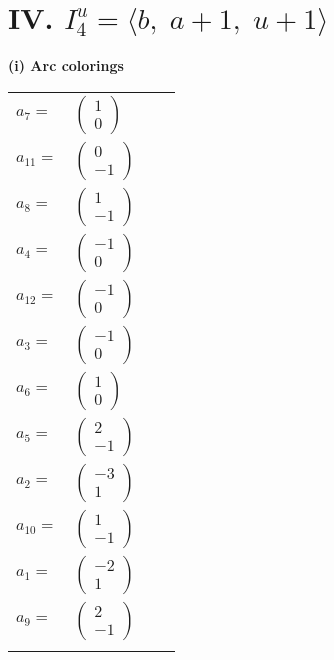 \documentclass[1p]{elsarticle_modified}
\theoremstyle{definition}
\begin{document}
\centering \section*{IV. $I^u_{4}= \langle b,\;a+1,\;u+1 \rangle$}
\flushleft \textbf{(i) Arc colorings}\\
\begin{tabular}{m{7pt} m{180pt} m{7pt} m{180pt} }
\flushright $a_{7}=$&$\begin{pmatrix}1\\0\end{pmatrix}$ \\
\flushright $a_{11}=$&$\begin{pmatrix}0\\-1\end{pmatrix}$ \\
\flushright $a_{8}=$&$\begin{pmatrix}1\\-1\end{pmatrix}$ \\
\flushright $a_{4}=$&$\begin{pmatrix}-1\\0\end{pmatrix}$ \\
\flushright $a_{12}=$&$\begin{pmatrix}-1\\0\end{pmatrix}$ \\
\flushright $a_{3}=$&$\begin{pmatrix}-1\\0\end{pmatrix}$ \\
\flushright $a_{6}=$&$\begin{pmatrix}1\\0\end{pmatrix}$ \\
\flushright $a_{5}=$&$\begin{pmatrix}2\\-1\end{pmatrix}$ \\
\flushright $a_{2}=$&$\begin{pmatrix}-3\\1\end{pmatrix}$ \\
\flushright $a_{10}=$&$\begin{pmatrix}1\\-1\end{pmatrix}$ \\
\flushright $a_{1}=$&$\begin{pmatrix}-2\\1\end{pmatrix}$ \\
\flushright $a_{9}=$&$\begin{pmatrix}2\\-1\end{pmatrix}$\\&\end{tabular}
\end{document}

